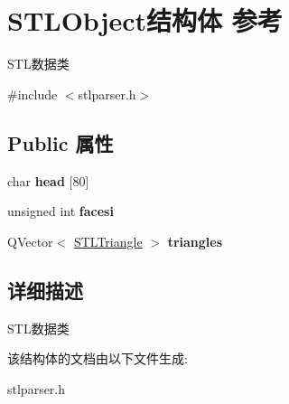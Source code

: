 \hypertarget{struct_s_t_l_object}{}\section{S\+T\+L\+Object结构体 参考}
\label{struct_s_t_l_object}


S\+T\+L数据类  




{\ttfamily \#include $<$stlparser.\+h$>$}

\subsection*{Public 属性}
\begin{DoxyCompactItemize}
\item 
\hypertarget{struct_s_t_l_object_a385ba72b6015a1bb21f5b10ca73286bb}{}char {\bfseries head} \mbox{[}80\mbox{]}\label{struct_s_t_l_object_a385ba72b6015a1bb21f5b10ca73286bb}

\item 
\hypertarget{struct_s_t_l_object_a0776d4ee4c46846cac60f3a7d5f4e386}{}unsigned int {\bfseries facesi}\label{struct_s_t_l_object_a0776d4ee4c46846cac60f3a7d5f4e386}

\item 
\hypertarget{struct_s_t_l_object_a503e3a79bdee4e54e134b211c0771279}{}Q\+Vector$<$ \hyperlink{struct_s_t_l_triangle}{S\+T\+L\+Triangle} $>$ {\bfseries triangles}\label{struct_s_t_l_object_a503e3a79bdee4e54e134b211c0771279}

\end{DoxyCompactItemize}


\subsection{详细描述}
S\+T\+L数据类 

该结构体的文档由以下文件生成\+:\begin{DoxyCompactItemize}
\item 
stlparser.\+h\end{DoxyCompactItemize}
